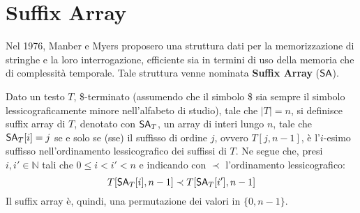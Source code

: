 \section{Suffix Array}
Nel 1976, Manber e Myers \cite{sa} proposero una struttura dati per la
memorizzazione di 
stringhe e la loro interrogazione, efficiente sia in termini di uso della
memoria che di complessità temporale. Tale struttura venne nominata
\textbf{Suffix Array} ($\mbox{\rm {\sf SA}}$).
\begin{definizione}
  Dato un testo $T$, \$-terminato (assumendo che il simbolo \$ sia sempre il
  simbolo lessicograficamente minore nell'alfabeto di studio), tale che $|T|=n$,
  si definisce suffix 
    array di $T$, denotato con $\mbox{\rm {\sf SA}}_T$, un array di interi lungo $n$, tale che
  $\mbox{\rm {\sf SA}}_T[i]=j$ se e solo se (sse) il suffisso di ordine $j$, ovvero $T[j,n-1]$,
  è 
  l'$i$-esimo suffisso nell’ordinamento lessicografico dei suffissi di $T$. Ne
  segue che, presi $i,i'\in \mathbb{N}$
  tali che $0\leq i < i' < n$ e indicando con $\prec$
  l'ordinamento lessicografico:
  \begin{equation}
    \label{eq:saord}
    T[\mbox{\rm {\sf SA}}_T[i],n-1] \prec T[\mbox{\rm {\sf SA}}_T[i'],n-1]
  \end{equation}
  Il suffix array è, quindi, una permutazione dei valori in
  $\{0,n-1\}$. 
\end{definizione}
